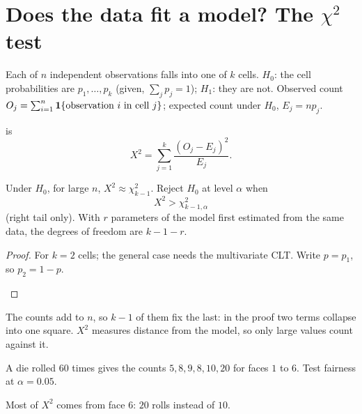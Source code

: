 \section{Does the data fit a model? The $\chi^2$ test}

\begin{setup}
Each of $n$ independent observations falls into one of $k$ cells. $H_0$: the cell probabilities are $p_1,\dots,p_k$ (given, $\sum_jp_j=1$); $H_1$: they are not. Observed count $O_j=\sum_{i=1}^n\mathbf{1}\{\text{observation }i\text{ in cell }j\}$; expected count under $H_0$, $E_j=np_j$.
\end{setup}

\begin{definition}
 is
\[
  \boxed{\;X^2=\sum_{j=1}^k\frac{(O_j-E_j)^2}{E_j}.\;}
\]
\end{definition}

\begin{theorem}
Under $H_0$, for large $n$, $X^2\approx\chi^2_{k-1}$. Reject $H_0$ at level $\alpha$ when
\[
  \boxed{\;X^2>\chi^2_{k-1,\alpha}\;}
\]
(right tail only). With $r$ parameters of the model first estimated from the same data, the degrees of freedom are $k-1-r$.
\end{theorem}
\begin{proof}
For $k=2$ cells; the general case needs the multivariate CLT. Write $p=p_1$, so $p_2=1-p$.
\begin{deriv}
\end{deriv}
\end{proof}

The counts add to $n$, so $k-1$ of them fix the last: in the proof two terms collapse into one square. $X^2$ measures distance from the model, so only large values count against it.

\begin{example}
A die rolled $60$ times gives the counts $5,8,9,8,10,20$ for faces $1$ to $6$. Test fairness at $\alpha=0.05$.
\begin{deriv}
\end{deriv}
Most of $X^2$ comes from face $6$: $20$ rolls instead of $10$.
\end{example}
